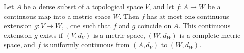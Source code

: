 \begin{lemma} \cite[Lemma 7.3.19]{goubault-larrecqNonHausdorffTopologyDomain2013}  \label{lem:completion_unique}
Let \( A \) be a dense subset of a topological space \( V \), and let  
\( f: A \to W \) be a continuous map into a metric space \( W \).  
Then \( f \) has at most one continuous extension \( g: V \to W \), \ie, one such that $f$ and $g$ coincide on $A$.  
This continuous extension \( g \) exists if \( (V,d_V) \) is a metric space, \( (W,d_W) \) is a complete metric space, and \( f \) is uniformly continuous from \( (A,d_V) \) to \( (W,d_W) \). 
\end{lemma}


